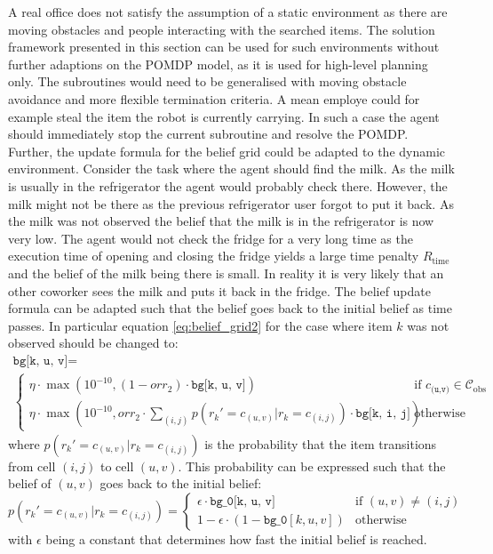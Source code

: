 A real office does not satisfy the assumption of a static environment as there are moving obstacles and people interacting with the searched items. 
The solution framework presented in this section can be used for such environments without further adaptions on the POMDP model, as it is used for high-level planning only. The subroutines would need to be generalised with moving obstacle avoidance and more flexible termination criteria. A mean employe could for example steal the item the robot is currently carrying. In such a case the agent should immediately stop the current subroutine and resolve the POMDP. Further, the update formula for the belief grid could be adapted to the dynamic environment. Consider the task where the agent should find the milk. As the milk is usually in the refrigerator the agent would probably check there. However, the milk might not be there as the previous refrigerator user forgot to put it back. As the milk was not observed the belief that the milk is in the refrigerator is now very low. The agent would not check the fridge for a very long time as the execution time of opening and closing the fridge yields a large time penalty $R_\text{time}$ and the belief of the milk being there is small. In reality it is very likely that an other coworker sees the milk and puts it back in the fridge. The belief update formula can be adapted such that the belief goes back to the initial belief as time passes. In particular equation \ref{eq:belief_grid2} for the case where item $k$ was not observed should be changed to:
\begin{multline}
    \texttt{bg[k, u, v]} = \\
    \begin{cases} 
        \eta \cdot\max\left(10^{-10}, (1 -  orr_2) \cdot \texttt{bg[k, u, v]}\right) &\text{if }c_\texttt{(u,v)} \in \mathcal{C}_\text{obs}\\
        \eta \cdot \max\left(10^{-10}, orr_2 \cdot \sum_{(i,j)}p(r_k'=c_{(u,v)}|r_k=c_{(i,j)}) \cdot \texttt{bg[k, i, j]}\right) &\text{otherwise}
    \end{cases}
\end{multline}
where $p(r_k'=c_{(u,v)}|r_k=c_{(i,j)})$ is the probability that the item transitions from cell $(i,j)$ to cell $(u,v)$. This probability can be expressed such that the belief of $(u,v)$ goes back to the initial belief: 
\begin{equation}
    p(r_k'=c_{(u,v)}|r_k=c_{(i,j)}) = \begin{cases}
    \epsilon \cdot \texttt{bg\_0[k, u, v]} &\text{if } (u,v)\neq (i,j)\\
    1 - \epsilon \cdot (1-\texttt{bg\_0}[k, u, v]) &\text{otherwise}
    \end{cases}
\end{equation}
with $\epsilon$ being a constant that determines how fast the initial belief is reached.\\

